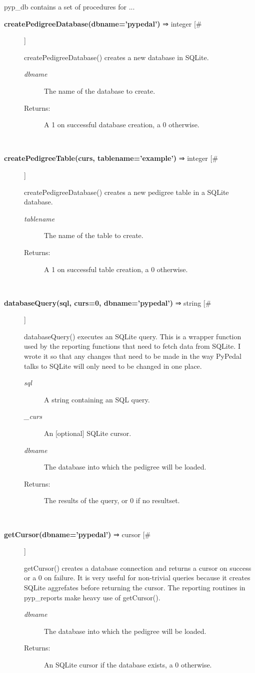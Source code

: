 \par pyp\_db contains a set of procedures for ...
\begin{description}
\item[\textbf{createPedigreeDatabase(dbname='pypedal')} ⇒ integer [\#]
]
\par createPedigreeDatabase() creates a new database in SQLite.
\begin{description}
\item[\textit{dbname}
]
The name of the database to create.
\item[Returns:
]
A 1 on successful database creation, a 0 otherwise.
\end{description}\\

\item[\textbf{createPedigreeTable(curs, tablename='example')} ⇒ integer [\#]
]
\par createPedigreeDatabase() creates a new pedigree table in a SQLite
database.
\begin{description}
\item[\textit{tablename}
]
The name of the table to create.
\item[Returns:
]
A 1 on successful table creation, a 0 otherwise.
\end{description}\\

\item[\textbf{databaseQuery(sql, curs=0, dbname='pypedal')} ⇒ string [\#]
]
\par databaseQuery() executes an SQLite query.  This is a wrapper function
used by the reporting functions that need to fetch data from SQLite.
I wrote it so that any changes that need to be made in the way PyPedal
talks to SQLite will only need to be changed in one place.
\begin{description}
\item[\textit{sql}
]
A string containing an SQL query.
\item[\textit{\_curs}
]
An [optional] SQLite cursor.
\item[\textit{dbname}
]
The database into which the pedigree will be loaded.
\item[Returns:
]
The results of the query, or 0 if no resultset.
\end{description}\\

\item[\textbf{getCursor(dbname='pypedal')} ⇒ cursor [\#]
]
\par getCursor() creates a database connection and returns a
cursor on success or a 0 on failure.  It is very useful for
non-trivial queries because it creates SQLite aggrefates
before returning the cursor.  The reporting routines in pyp\_reports
make heavy use of getCursor().
\begin{description}
\item[\textit{dbname}
]
The database into which the pedigree will be loaded.
\item[Returns:
]
An SQLite cursor if the database exists, a 0 otherwise.
\end{description}\\


\end{description}
